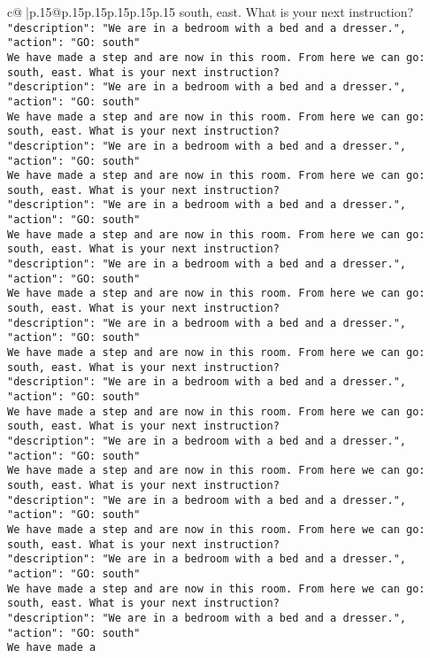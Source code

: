 \documentclass{article}
\begin{document}
{\begin{supertabular}{c@{$\;$}|p{.15\linewidth}@{}p{.15\linewidth}p{.15\linewidth}p{.15\linewidth}p{.15\linewidth}p{.15\linewidth}}
{{{south, east. What is your next instruction?\\ \tt {"description": "We are in a bedroom with a bed and a dresser.", "action": "GO: south"}\\ \tt We have made a step and are now in this room. From here we can go: south, east. What is your next instruction?\\ \tt {"description": "We are in a bedroom with a bed and a dresser.", "action": "GO: south"}\\ \tt We have made a step and are now in this room. From here we can go: south, east. What is your next instruction?\\ \tt {"description": "We are in a bedroom with a bed and a dresser.", "action": "GO: south"}\\ \tt We have made a step and are now in this room. From here we can go: south, east. What is your next instruction?\\ \tt {"description": "We are in a bedroom with a bed and a dresser.", "action": "GO: south"}\\ \tt We have made a step and are now in this room. From here we can go: south, east. What is your next instruction?\\ \tt {"description": "We are in a bedroom with a bed and a dresser.", "action": "GO: south"}\\ \tt We have made a step and are now in this room. From here we can go: south, east. What is your next instruction?\\ \tt {"description": "We are in a bedroom with a bed and a dresser.", "action": "GO: south"}\\ \tt We have made a step and are now in this room. From here we can go: south, east. What is your next instruction?\\ \tt {"description": "We are in a bedroom with a bed and a dresser.", "action": "GO: south"}\\ \tt We have made a step and are now in this room. From here we can go: south, east. What is your next instruction?\\ \tt {"description": "We are in a bedroom with a bed and a dresser.", "action": "GO: south"}\\ \tt We have made a step and are now in this room. From here we can go: south, east. What is your next instruction?\\ \tt {"description": "We are in a bedroom with a bed and a dresser.", "action": "GO: south"}\\ \tt We have made a step and are now in this room. From here we can go: south, east. What is your next instruction?\\ \tt {"description": "We are in a bedroom with a bed and a dresser.", "action": "GO: south"}\\ \tt We have made a step and are now in this room. From here we can go: south, east. What is your next instruction?\\ \tt {"description": "We are in a bedroom with a bed and a dresser.", "action": "GO: south"}\\ \tt We have made a }}}
\end{supertabular}}
\end{document}
